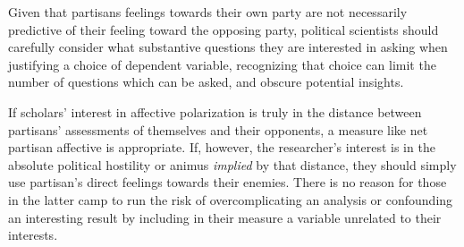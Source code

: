 \documentclass[12pt]{paper}
\begin{document}
Given that partisans feelings towards their own party are not necessarily predictive of their feeling toward the opposing party, political scientists should carefully consider what substantive questions they are interested in asking when justifying a choice of dependent variable, recognizing that choice can limit the number of questions which can be asked, and obscure potential insights.

If scholars' interest in affective polarization is truly in the distance between partisans' assessments of themselves and their opponents, a measure like net partisan affective is appropriate. If, however, the researcher's interest is in the absolute political hostility or animus \textit{implied} by that distance, they should simply use partisan's direct feelings towards their enemies. There is no reason for those in the latter camp to run the risk of overcomplicating an analysis or confounding an interesting result by including in their measure a variable unrelated to their interests.






\thispagestyle{empty}
\clearpage
{}




\end{document}
